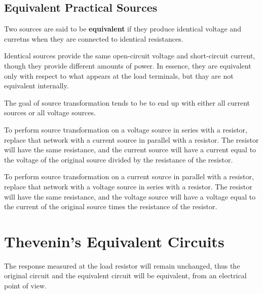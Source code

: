 \documentclass[12pt]{article}
\begin{document}
\subsection*{Equivalent Practical Sources}
Two sources are said to be {\bf equivalent} if they produce identical voltage and curretns when they are connected to identical resistances.

Identical sources provide the same open-circuit voltage and short-circuit current, though they provide different amounts of power. In essence, they are equivalent only with respect to what appears at the load terminals, but thay are not equivalent internally.

The goal of source transformation tends to be to end up with either all current sources or all voltage sources.

To perform source transformation on a voltage source in series with a resistor, replace that network with a current source in parallel with a resistor. The resistor will have the same resistance, and the current source will have a current equal to the voltage of the original source divided by the resistance of the resistor.

To perform source transformation on a current source in parallel with a resistor, replace that network with a voltage source in series with a resistor. The resistor will have the same resistance, and the voltage source will have a voltage equal to the current of the original source times the resistance of the resistor.

\section*{Thevenin's Equivalent Circuits}

The response measured at the load resistor will remain unchanged, thus the original circuit and the equivalent circuit will be equivalent, from an electrical point of view.
\end{document}
